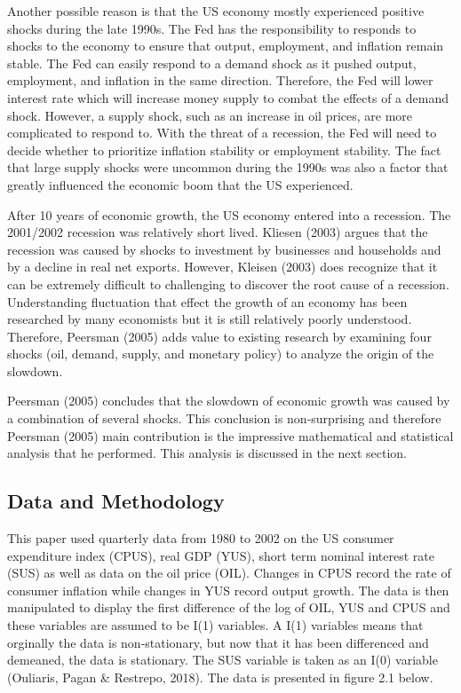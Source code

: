 \documentclass[11pt,preprint, authoryear]{elsarticle}
\numberwithin{equation}{section}
\numberwithin{figure}{section}
\numberwithin{table}{section}
\begin{document}
Another possible reason is that the US economy mostly experienced
positive shocks during the late 1990s. The Fed has the responsibility to
responds to shocks to the economy to ensure that output, employment, and
inflation remain stable. The Fed can easily respond to a demand shock as
it pushed output, employment, and inflation in the same direction.
Therefore, the Fed will lower interest rate which will increase money
supply to combat the effects of a demand shock. However, a supply shock,
such as an increase in oil prices, are more complicated to respond to.
With the threat of a recession, the Fed will need to decide whether to
prioritize inflation stability or employment stability. The fact that
large supply shocks were uncommon during the 1990s was also a factor
that greatly influenced the economic boom that the US experienced.

After 10 years of economic growth, the US economy entered into a
recession. The 2001/2002 recession was relatively short lived. Kliesen
(2003) argues that the recession was caused by shocks to investment by
businesses and households and by a decline in real net exports. However,
Kleisen (2003) does recognize that it can be extremely difficult to
challenging to discover the root cause of a recession. Understanding
fluctuation that effect the growth of an economy has been researched by
many economists but it is still relatively poorly understood. Therefore,
Peersman (2005) adds value to existing research by examining four shocks
(oil, demand, supply, and monetary policy) to analyze the origin of the
slowdown.

Peersman (2005) concludes that the slowdown of economic growth was
caused by a combination of several shocks. This conclusion is
non-surprising and therefore Peersman (2005) main contribution is the
impressive mathematical and statistical analysis that he performed. This
analysis is discussed in the next section.

\hypertarget{data-and-methodology}{%
\subsection{Data and Methodology}\label{data-and-methodology}}

This paper used quarterly data from 1980 to 2002 on the US consumer
expenditure index (CPUS), real GDP (YUS), short term nominal interest
rate (SUS) as well as data on the oil price (OIL). Changes in CPUS
record the rate of consumer inflation while changes in YUS record output
growth. The data is then manipulated to display the first difference of
the log of OIL, YUS and CPUS and these variables are assumed to be I(1)
variables. A I(1) variables means that orginally the data is
non-stationary, but now that it has been differenced and demeaned, the
data is stationary. The SUS variable is taken as an I(0) variable
(Ouliaris, Pagan \& Restrepo, 2018). The data is presented in figure 2.1
below.
\end{document}
